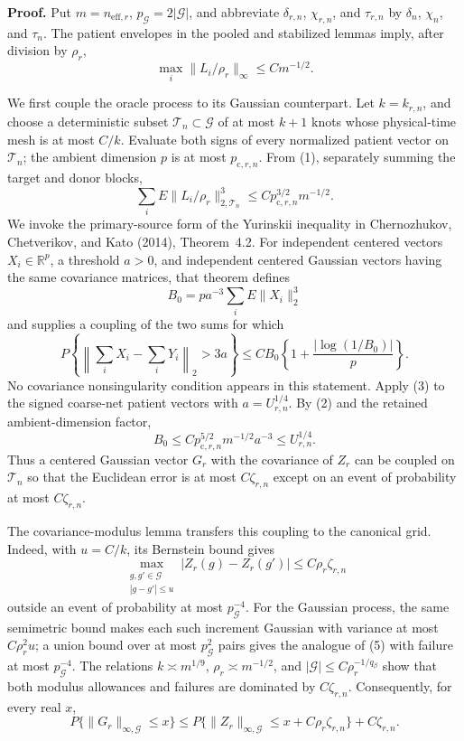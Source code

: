 \textbf{Proof.}
Put \(m=n_{\mathrm{eff},r}\), \(p_{\mathcal G}=2|\mathcal G|\), and abbreviate \(\delta_{r,n}\), \(\chi_{r,n}\), and \(\tau_{r,n}\) by \(\delta_n\), \(\chi_n\), and \(\tau_n\). The patient envelopes in the pooled and stabilized lemmas imply, after division by \(\rho_r\),
\[
 \max_i\|L_i/\rho_r\|_\infty\le Cm^{-1/2}.               \tag{1}
\]

We first couple the oracle process to its Gaussian counterpart. Let \(k=k_{r,n}\), and choose a deterministic subset \(\mathcal T_n\subset\mathcal G\) of at most \(k+1\) knots whose physical-time mesh is at most \(C/k\). Evaluate both signs of every normalized patient vector on \(\mathcal T_n\); the ambient dimension \(p\) is at most \(p_{\mathrm c,r,n}\). From (1), separately summing the target and donor blocks,
\[
 \sum_iE\|L_i/\rho_r\|_{2,\mathcal T_n}^3
 \le Cp_{\mathrm c,r,n}^{3/2}m^{-1/2}.                    \tag{2}
\]
We invoke the primary-source form of the Yurinskii inequality in Chernozhukov, Chetverikov, and Kato (2014), Theorem~4.2. For independent centered vectors \(X_i\in\mathbb R^p\), a threshold \(a>0\), and independent centered Gaussian vectors having the same covariance matrices, that theorem defines
\[
 B_0=pa^{-3}\sum_iE\|X_i\|_2^3
\]
and supplies a coupling of the two sums for which
\[
 P\left\{\left\|\sum_iX_i-\sum_iY_i\right\|_2>3a\right\}
 \le C B_0\left\{1+\frac{|\log(1/B_0)|}{p}\right\}.       \tag{3}
\]
No covariance nonsingularity condition appears in this statement. Apply (3) to the signed coarse-net patient vectors with \(a=U_{r,n}^{1/4}\). By (2) and the retained ambient-dimension factor,
\[
 B_0\le C p_{\mathrm c,r,n}^{5/2}m^{-1/2}a^{-3}
 \le U_{r,n}^{1/4}.                                      \tag{4}
\]
Thus a centered Gaussian vector \(G_r\) with the covariance of \(Z_r\) can be coupled on \(\mathcal T_n\) so that the Euclidean error is at most \(C\zeta_{r,n}\) except on an event of probability at most \(C\zeta_{r,n}\).

The covariance-modulus lemma transfers this coupling to the canonical grid. Indeed, with \(u=C/k\), its Bernstein bound gives
\[
 \max_{\substack{g,g'\in\mathcal G\\|g-g'|\le u}}
 |Z_r(g)-Z_r(g')|\le C\rho_r\zeta_{r,n}                  \tag{5}
\]
outside an event of probability at most \(p_{\mathcal G}^{-4}\). For the Gaussian process, the same semimetric bound makes each such increment Gaussian with variance at most \(C\rho_r^2u\); a union bound over at most \(p_{\mathcal G}^2\) pairs gives the analogue of (5) with failure at most \(p_{\mathcal G}^{-4}\). The relations \(k\asymp m^{1/9}\), \(\rho_r\asymp m^{-1/2}\), and \(|\mathcal G|\le C\rho_r^{-1/q_\beta}\) show that both modulus allowances and failures are dominated by \(C\zeta_{r,n}\). Consequently, for every real \(x\),
\[
 P\{\|G_r\|_{\infty,\mathcal G}\le x\}
 \le P\{\|Z_r\|_{\infty,\mathcal G}
 \le x+C\rho_r\zeta_{r,n}\}+C\zeta_{r,n}.              \tag{6}
\]

